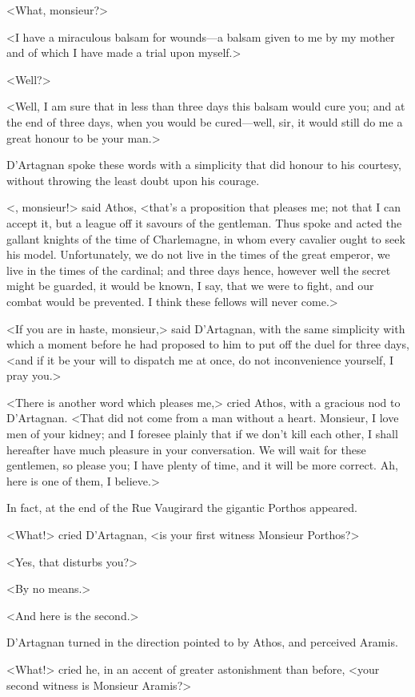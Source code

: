 <What, monsieur?> 

<I have a miraculous balsam for wounds—a balsam given to me by my mother and of which I have made a trial upon myself.> 

<Well?> 

<Well, I am sure that in less than three days this balsam would cure you; and at the end of three days, when you would be cured—well, sir, it would still do me a great honour to be your man.> 

D'Artagnan spoke these words with a simplicity that did honour to his courtesy, without throwing the least doubt upon his courage. 

<, monsieur!> said Athos, <that's a proposition that pleases me; not that I can accept it, but a league off it savours of the gentleman. Thus spoke and acted the gallant knights of the time of Charlemagne, in whom every cavalier ought to seek his model. Unfortunately, we do not live in the times of the great emperor, we live in the times of the cardinal; and three days hence, however well the secret might be guarded, it would be known, I say, that we were to fight, and our combat would be prevented. I think these fellows will never come.> 

<If you are in haste, monsieur,> said D'Artagnan, with the same simplicity with which a moment before he had proposed to him to put off the duel for three days, <and if it be your will to dispatch me at once, do not inconvenience yourself, I pray you.> 

<There is another word which pleases me,> cried Athos, with a gracious nod to D'Artagnan. <That did not come from a man without a heart. Monsieur, I love men of your kidney; and I foresee plainly that if we don't kill each other, I shall hereafter have much pleasure in your conversation. We will wait for these gentlemen, so please you; I have plenty of time, and it will be more correct. Ah, here is one of them, I believe.> 

In fact, at the end of the Rue Vaugirard the gigantic Porthos appeared. 

<What!> cried D'Artagnan, <is your first witness Monsieur Porthos?> 

<Yes, that disturbs you?> 

<By no means.> 

<And here is the second.> 

D'Artagnan turned in the direction pointed to by Athos, and perceived Aramis. 

<What!> cried he, in an accent of greater astonishment than before, <your second witness is Monsieur Aramis?> 

